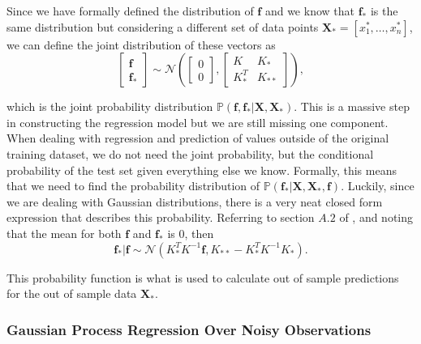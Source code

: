 Since we have formally defined the distribution of $\boldsymbol{f}$ and we know that $\boldsymbol{f}_*$ is the same distribution but considering a different set of data points $\boldsymbol{X}_* = [x^*_1, \ldots, x^*_n]$, we can define the joint distribution of these vectors as 
\begin{equation}
\label{joint_dist}
 \begin{bmatrix}
	\boldsymbol{f} \\
	\boldsymbol{f}_*
\end{bmatrix} \sim \mathcal{N}\left( \begin{bmatrix}
0 \\
0
\end{bmatrix} , \begin{bmatrix}
K & K_* \\
K_*^T & K_{**}
\end{bmatrix} \right), 
\end{equation}

which is the joint probability distribution $\mathbb{P}(\boldsymbol{f}, \boldsymbol{f}_* | \boldsymbol{X}, \boldsymbol{X}_*)$. This is a massive step in constructing the regression model but we are still missing one component. When dealing with regression and prediction of values outside of the original training dataset, we do not need the joint probability, but the conditional probability of the test set given everything else we know. Formally, this means that we need to find the probability distribution of $\mathbb{P}(\boldsymbol{f}_* | \boldsymbol{X}, \boldsymbol{X}_*, \boldsymbol{f})$. Luckily, since we are dealing with Gaussian distributions, there is a very neat closed form expression that describes this probability. Referring to section $A.2$ of \cite{rasmussen2006gaussian}, and noting that the mean for both $\boldsymbol{f}$ and $\boldsymbol{f}_*$ is 0, then 
\[ \boldsymbol{f}_* | \boldsymbol{f} \sim \mathcal{N}(K_*^T K^{-1} \boldsymbol{f}, K_{**} - K_*^T K^{-1} K_*). \]

This probability function is what is used to calculate out of sample predictions for the out of sample data $\boldsymbol{X}_*$. 

\subsubsection{Gaussian Process Regression Over Noisy Observations}

